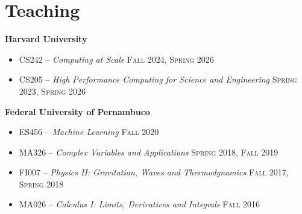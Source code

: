 \documentclass[letterpaper,10pt]{article}
\newcommand{\entry}[4]{

\begin{minipage}[t]{.15\textwidth}
\end{minipage}
\hfill\vline\hfill 
\begin{minipage}[t]{0.95\textwidth}
#2 \hfill \textsc{#1}

\textit{#3}

\footnotesize{#4}
\end{minipage}\\\vspace{.25cm}}
\newcommand{\harv}{Harvard University}
\newcommand{\ufpe}{Federal University of Pernambuco}
\newcommand{\mycomment}[1]{}
\begin{document}
\vspace*{-.25cm}
\section{Teaching}
\textbf{\harv}
\vspace{-0.5em}
\begin{itemize}[label={}]
    \setlength\itemsep{0.1em}
	\item CS242 -- \textit{Computing at Scale} \hfill\textsc{Fall 2024, Spring 2026}
	\item CS205 -- \textit{High Performance Computing for Science and Engineering} \hfill\textsc{Spring 2023, Spring 2026}
\end{itemize}
\hspace{1.5em}\textbf{\ufpe} 
\vspace{-0.5em}
\begin{itemize}[label={}]
    \setlength\itemsep{0.1em}
    \item ES456 -- \textit{Machine Learning} \hfill\textsc{Fall 2020}
    \item MA326 -- \textit{Complex Variables and Applications} \hfill\textsc{Spring 2018, Fall 2019}
    \item FI007 -- \textit{Physics II: Gravitation, Waves and Thermodynamics} \hfill\textsc{Fall 2017, Spring 2018}
    \item MA026 -- \textit{Calculus I: Limits, Derivatives and Integrals} \hfill\textsc{Fall 2016} 
\end{itemize}
\vspace*{-.25cm}
\mycomment{
\entry{Spring 2023}{CS205 -- \textbf{High Performance Computing} -- Teaching Fellow}{\harv}{
	I led lab activites, held office hours, assisted the teaching staff on grading assignments, and mentored some of the final projects.
	}

\entry{Fall 2020}{ES456 -- \textbf{Machine Learning} -- Teaching Assistant}{\ufpe}{
	I conducted my own activities and lectures off of my own syllabus. Supported the students developing projects and graded work.
	}

\entry{2018--2019}{MA326 -- \textbf{Complex Variables and Applications} -- Teaching Assistant}{\ufpe}{
	I taught once-a-week sessions to support students in their assignments.
	}

\entry{2017--2018}{FI007 -- \textbf{Physics II: Gravitation, Waves and Thermodynamics} -- Teaching Assistant}{\ufpe}{
	I wrote some extra assignments for students interested in Olympic-level Physics, as well as once-a-week sessions to discuss.
	}

\entry{Fall 2016}{MA026 -- \textbf{Calculus I: Limits, Derivatives and Integrals} -- Teaching Assistant}{\ufpe}{
	I taught once-a-week sessions to support students in their assignments.
	}
}
\end{document}
